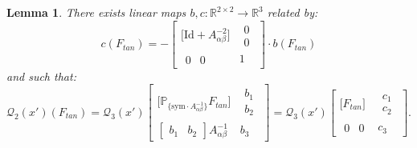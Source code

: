 \documentclass[leqno,twoside, 11pt]{amsart}
\theoremstyle{plain}
\newtheorem{lemma}[theorem]{Lemma}
\theoremstyle{definition}
\numberwithin{equation}{section}
\numberwithin{figure}{section}
\begin{document}
\begin{lemma}\label{lem2}
There exists linear maps $b,c:\mathbb{R}^{2\times 2}\longrightarrow \mathbb{R}^3$
related by:
$$ c\left(F_{tan}\right) = -  
\left[\begin{array}{cc}\Big[\mathrm{Id} + A_{\alpha\beta}^{-2} \Big]
& \begin{array}{c} 0\\ 0\end{array}\\
\begin{array}{cc} 0 &  0 \end{array}
& 1 \end{array}\right]\cdot b\left(F_{tan}\right)$$
and such that:
\begin{equation}\label{rep}
\mathcal{Q}_2(x')(F_{tan}) = 
\mathcal{Q}_3(x')\left[\begin{array}{cc} 
\Big[\mathbb{P}_{\{\mathrm{sym}\cdot A_{\alpha\beta}^{-1}\}} F_{tan}\Big]
& \begin{array}{c} b_{1}\\ b_{2}\end{array}\\
\left[\begin{array}{cc} b_{1} &  b_{2} \end{array}\right] A_{\alpha\beta}^{-1}
& b_{3} \end{array}\right]
= \mathcal{Q}_3(x')\left[\begin{array}{cc} \Big[F_{tan}\Big]
& \begin{array}{c} c_{1}\\ c_{2}\end{array}\\
\begin{array}{cc} 0 &  0 \end{array} & c_{3} \end{array}\right].
\end{equation}
\end{lemma}
\end{document}
